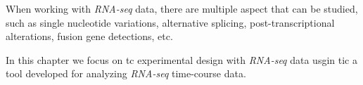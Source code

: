 When working with \textit{RNA-seq} data, there are multiple aspect that can be studied, such as single nucleotide variations, alternative splicing, post-transcriptional alterations, fusion gene detections, etc.


In this chapter we focus on \gls{tc} experimental design with \textit{RNA-seq} data usgin \gls{tic} a tool developed for analyzing \textit{RNA-seq} time-course data.

